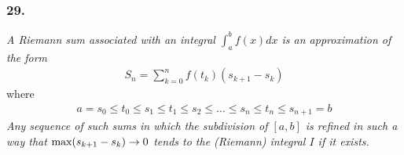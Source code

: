 \documentclass[12pt]{article}
\begin{document}
\subsubsection*{29.}
{\it A Riemann sum associated with an integral $\int_a^b f(x) dx$ is an approximation of the form}
\begin{align*}
	S_n = \sum\limits_{k = 0}^n f(t_k)(s_{k+1} - s_k)
\end{align*}
where
\begin{align*}
	a = s_0 \leq t_0 \leq s_1 \leq t_1 \leq s_2 \leq \dots \leq s_n \leq t_n \leq s_{n+1} = b
\end{align*}
{\it Any sequence of such sums in which the subdivision of $[a, b]$ is refined in such a way that $\text{\rm max}(s_{k+1} - s_k) \rightarrow 0$ tends to the (Riemann) integral $I$ if it exists.}
\end{document}
